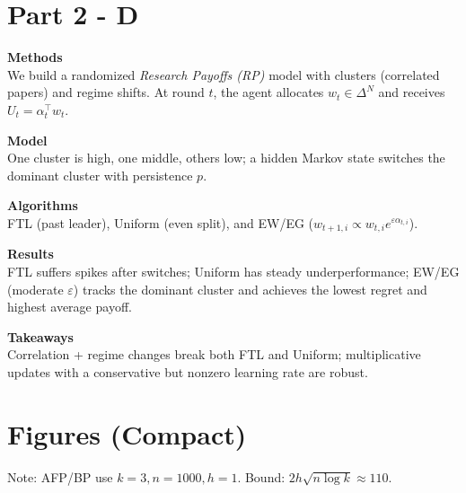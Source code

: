 \documentclass[10pt]{article}
\renewenvironment{shaded}{%
  \def\FrameCommand{\fboxsep=\FrameSep \colorbox{shadecolor}}%
  \MakeFramed{\advance\hsize-\width \FrameRestore\FrameRestore}}%
 {\endMakeFramed}
\begin{document}
\section{Part 2 - D}
\begin{shaded}
\textbf{Methods}\\
We build a randomized \emph{Research Payoffs (RP)} model with clusters (correlated papers) and regime shifts.
At round $t$, the agent allocates $w_t\in\Delta^N$ and receives $U_t=\alpha_t^\top w_t$.

\textbf{Model}\\
One cluster is high, one middle, others low; a hidden Markov state switches the dominant cluster with persistence $p$.

\textbf{Algorithms}\\
FTL (past leader), Uniform (even split), and EW/EG ($w_{t+1,i}\propto w_{t,i}e^{\varepsilon \alpha_{t,i}}$).

\textbf{Results}\\
FTL suffers spikes after switches; Uniform has steady underperformance; EW/EG (moderate $\varepsilon$) tracks the dominant cluster and achieves the lowest regret and highest average payoff.

\textbf{Takeaways}\\
Correlation + regime changes break both FTL and Uniform; multiplicative updates with a conservative but nonzero learning rate are robust.
\end{shaded}


\section*{Figures (Compact)}
\vspace{-0.3em}
\noindent\small Note: AFP/BP use $k{=}3,n{=}1000,h{=}1$. Bound: $2h\sqrt{n\log k}\approx110$.
\end{document}
